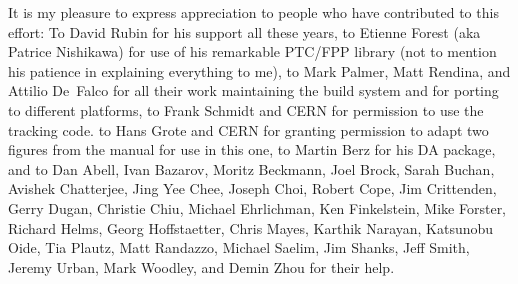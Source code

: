 It is my pleasure to express appreciation to people who have
contributed to this effort: To David Rubin for his support all these
years, to Etienne Forest (aka Patrice Nishikawa) for use of his
remarkable PTC/FPP library (not to mention his patience in explaining
everything to me), to Mark Palmer, Matt Rendina, and Attilio De~Falco
for all their work maintaining the build system and for porting \bmad
to different platforms, to Frank Schmidt and CERN for permission to
use the \mad tracking code. to Hans Grote and CERN for granting
permission to adapt two figures from the \mad manual for use in this
one, to Martin Berz for his DA package, and to Dan Abell, Ivan
Bazarov, Moritz Beckmann, Joel Brock, Sarah Buchan, Avishek
Chatterjee, Jing Yee Chee, Joseph Choi, Robert Cope, Jim Crittenden,
Gerry Dugan, Christie Chiu, Michael Ehrlichman, Ken Finkelstein, Mike
Forster, Richard Helms, Georg Hoffstaetter, Chris Mayes, Karthik
Narayan, Katsunobu Oide, Tia Plautz, Matt Randazzo, Michael Saelim,
Jim Shanks, Jeff Smith, Jeremy Urban, Mark Woodley, and Demin Zhou for
their help.

